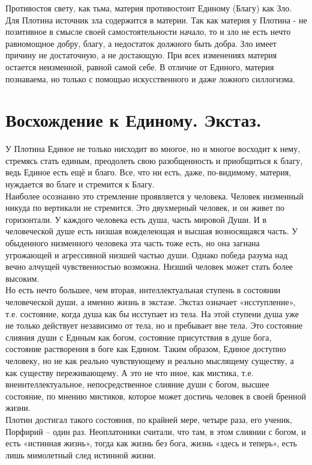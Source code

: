 \documentclass[a4paper,12pt]{article}
\begin{document}
Противостоя свету, как тьма, материя противостоит Единому (Благу) как Зло. Для Плотина источник зла содержится в материи. Так как материя у Плотина - не позитивное в смысле своей самостоятельности начало, то и зло не есть нечто равномощное добру, благу, а недостаток должного быть добра. Зло имеет причину не достаточную, а не достающую. При всех изменениях материя остается неизменной, равной самой себе. В отличие от Единого, материя познаваема, но только с помощью искусственного и даже ложного силлогизма.
\newpage
\part{Восхождение к Единому. Экстаз.}
У Плотина Единое не только нисходит во многое, но и многое восходит к нему, стремясь стать единым, преодолеть свою разобщенность и приобщиться к благу, ведь Единое есть ещё и благо. Все, что ни есть, даже, по-видимому, материя, нуждается во благе и стремится к Благу.\\

Наиболее осознанно это стремление проявляется у человека. Человек низменный никуда по вертикали не стремится. Это двухмерный человек, и он живет по горизонтали. У каждого человека есть душа, часть мировой Души. И в человеческой душе есть низшая вожделеющая и высшая возносящаяся часть. У обыденного низменного человека эта часть тоже есть, но она загнана угрожающей и агрессивной низшей частью души. Однако победа разума над вечно алчущей чувственностью возможна. Низший человек может стать более высоким.\\ 
 
Но есть нечто большее, чем вторая, интеллектуальная ступень в состоянии человеческой души, а именно жизнь в экстазе. Экстаз означает «исступление», т.е. состояние, когда душа как бы исступает из тела. На этой ступени душа уже не только действует независимо от тела, но и пребывает вне тела. Это состояние слияния души с Единым как богом, состояние присутствия в душе бога, состояние растворения в боге как Едином. Таким образом, Единое доступно человеку, но не как реально чувствующему и реально мыслящему существу, а как существу переживающему. А это не что иное, как мистика, т.е. внеинтеллектуальное, непосредственное слияние души с богом, высшее состояние, по мнению мистиков, которое может достичь человек в своей бренной жизни.\\

Плотин достигал такого состояния, по крайней мере, четыре раза, его ученик, Порфирий – один раз. Неоплатоники считали, что там, в этом слиянии с богом, и есть «истинная жизнь», тогда как жизнь без бога, жизнь «здесь и теперь», есть лишь мимолетный след истинной жизни.
\newpage
\end{document}
